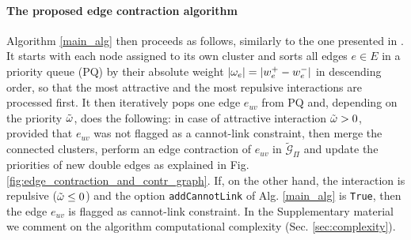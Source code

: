 \paragraph{The proposed edge contraction algorithm} Algorithm \ref{main_alg} then proceeds as follows, similarly to the one presented in \cite{levinkov2017comparative}. It starts with each node assigned to its own cluster and sorts all edges $e\in E$ in a priority queue (PQ) by their absolute weight $|\omega_e|=|w_e^+ - w_e^-|$ in descending order, so that the most attractive and the most repulsive interactions are processed first. It then iteratively pops one edge $e_{uv}$ from PQ and, depending on the priority $\tilde{\omega}$, does the following: in case of attractive interaction $\tilde{\omega}>0$, provided that $e_{uv}$ was not flagged as a cannot-link constraint, then merge the connected clusters, perform an edge contraction of $e_{uv}$ in $\tilde{\mathcal{G}}_\Pi$ and update the priorities of new double edges as explained in Fig. \ref{fig:edge_contraction_and_contr_graph}. 
If, on the other hand, the interaction is repulsive ($\tilde{\omega}\leq 0$) and the option \texttt{addCannotLink} of Alg. \ref{main_alg} is \texttt{True}, then the edge $e_{uv}$ is flagged as cannot-link constraint.
In the Supplementary material we comment on the algorithm computational complexity (Sec. \ref{sec:complexity}).






